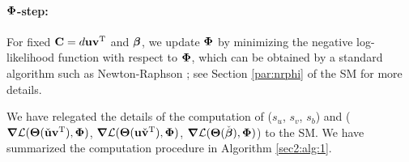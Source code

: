 \documentclass[12pt]{article}
\def\trans{^{\rm T}}
\newcommand{\bbL}{\mathcal{L}}
\DeclareMathOperator*{\argmin}{arg\,min}
\newcommand{\bs}{\boldsymbol}
\begin{document}


\paragraph{$\mbox{\boldmath $\Phi$}$-step:}\label{par:phi}
For fixed $\C= d\u\v\trans$ and $\mbox{\boldmath $\beta$}$, we update $\mbox{\boldmath $\Phi$}$ by minimizing the negative log-likelihood function with respect to $\mbox{\boldmath $\Phi$}$, which can be obtained by a standard algorithm such as Newton-Raphson \citep{citer2019}; see Section \ref{par:nrphi} of the SM for more details. 




We have relegated the details of the computation of ($s_u$, $s_v$, $s_b$) and ($\bs\nabla \bbL(\bs\Theta(\check{\u}\v\trans),\bPhi)$, $\bs\nabla \bbL(\bs\Theta(\u\check{\v}\trans),\bPhi)$, $\bs\nabla \bbL(\bs\Theta(\check{\bbeta}),\bPhi)$) to the SM. 
We have summarized the computation procedure in Algorithm \ref{sec2:alg:1}. 
\end{document}
